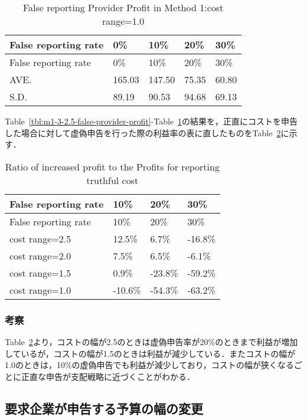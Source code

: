 \hypertarget{tbl:m1-3-1.0-false-provider-profit}{}
\begin{longtable}[H]{@{}lllll@{}}
\caption{\label{tbl:m1-3-1.0-false-provider-profit}False reporting
Provider Profit in Method 1:cost range=1.0}\tabularnewline
\toprule
False reporting rate & 0\% & 10\% & 20\% & 30\%\tabularnewline
\midrule
\endfirsthead
\toprule
False reporting rate & 0\% & 10\% & 20\% & 30\%\tabularnewline
\midrule
\endhead
AVE. & 165.03 & 147.50 & 75.35 & 60.80\tabularnewline
S.D. & 89.19 & 90.53 & 94.68 & 69.13\tabularnewline
\bottomrule
\end{longtable}

Table~\ref{tbl:m1-3-2.5-false-provider-profit}-Table~\ref{tbl:m1-3-1.0-false-provider-profit}の結果を，正直にコストを申告した場合に対して虚偽申告を行った際の利益率の表に直したものをTable~\ref{tbl:m1-3-profit-rate}に示す．

\hypertarget{tbl:m1-3-profit-rate}{}
\begin{longtable}[H]{@{}llll@{}}
\caption{\label{tbl:m1-3-profit-rate}Ratio of increased profit to the
Profits for reporting truthful cost}\tabularnewline
\toprule
False reporting rate & 10\% & 20\% & 30\%\tabularnewline
\midrule
\endfirsthead
\toprule
False reporting rate & 10\% & 20\% & 30\%\tabularnewline
\midrule
\endhead
cost range=2.5 & 12.5\% & 6.7\% & -16.8\%\tabularnewline
cost range=2.0 & 7.5\% & 6.5\% & -6.1\%\tabularnewline
cost range=1.5 & 0.9\% & -23.8\% & -59.2\%\tabularnewline
cost range=1.0 & -10.6\% & -54.3\% & -63.2\%\tabularnewline
\bottomrule
\end{longtable}

\hypertarget{ux8003ux5bdf-2}{%
\subsubsection{考察}\label{ux8003ux5bdf-2}}

Table~\ref{tbl:m1-3-profit-rate}より，コストの幅が2.5のときは虚偽申告率が20\%のときまで利益が増加しているが，コストの幅が1.5のときは利益が減少している．またコストの幅が1.0のときは，10\%の虚偽申告でも利益が減少しており，コストの幅が狭くなるごとに正直な申告が支配戦略に近づくことがわかる．

\hypertarget{ux8981ux6c42ux4f01ux696dux304cux7533ux544aux3059ux308bux4e88ux7b97ux306eux5e45ux306eux5909ux66f4}{%
\subsection{要求企業が申告する予算の幅の変更}\label{ux8981ux6c42ux4f01ux696dux304cux7533ux544aux3059ux308bux4e88ux7b97ux306eux5e45ux306eux5909ux66f4}}

